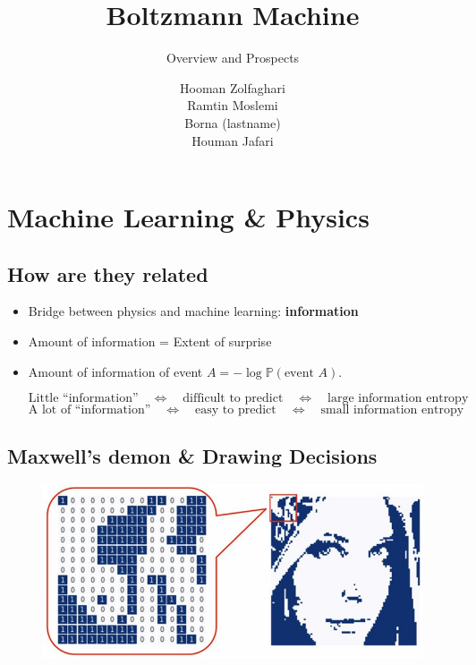 \documentclass{antclass}
\title{Boltzmann Machine}
\subtitle{Overview and Prospects}
\author{Hooman Zolfaghari \\ Ramtin Moslemi \\ Borna (lastname) \\ Houman Jafari}
\begin{document}
\maketitle
\chapter{Machine Learning \& Physics}

\section{How are they related}
\begin{itemize}
	\item Bridge between physics and machine learning:
	\textbf{information}
	\item Amount of information = Extent of surprise
	\item Amount of information of event \( A = - \log \mathbb{P}(\text{event }A) \).

	\[
	\text{Little ``information''} \quad \Leftrightarrow \quad \text{difficult to predict} \quad \Leftrightarrow \quad \text{large information entropy}
	\]
	\[
	\text{A lot of ``information''} \quad \Leftrightarrow \quad \text{easy to predict} \quad \Leftrightarrow \quad \text{small information entropy}
	\]
	
	
\end{itemize}

\section{Maxwell’s demon \& Drawing Decisions}

  \begin{figure}[ht]
	\centering
	\includegraphics[width=0.8\linewidth]{pics/MLandPhysics/drawing.jpg}
	\label{fig:drawing}
\end{figure}
\end{document}
